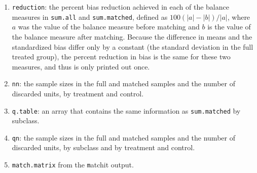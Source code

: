 \begin{enumerate}
\item \texttt{reduction}: the percent bias reduction achieved in
  each of the balance measures in \texttt{sum.all} and
  \texttt{sum.matched}, defined as $100(|a|-|b|)/|a|$, where $a$ was
  the value of the balance measure before matching and $b$ is the
  value of the balance measure after matching.  Because the difference
  in means and the standardized bias differ only by a constant (the
  standard deviation in the full treated group), the percent reduction
  in bias is the same for these two measures, and thus is only printed
  out once.

\item \texttt{nn}:  the sample sizes in the full and matched
  samples and the number of discarded units, by treatment and control.
  
\item \texttt{q.table}: an array that contains the same information
  as \texttt{sum.matched} by subclass.
  
\item \texttt{qn}: the sample sizes in the full and matched
  samples and the number of discarded units, by subclass and by
  treatment and control.
\item \texttt{match.matrix} from the {\texttt matchit} output.
\end{enumerate}

